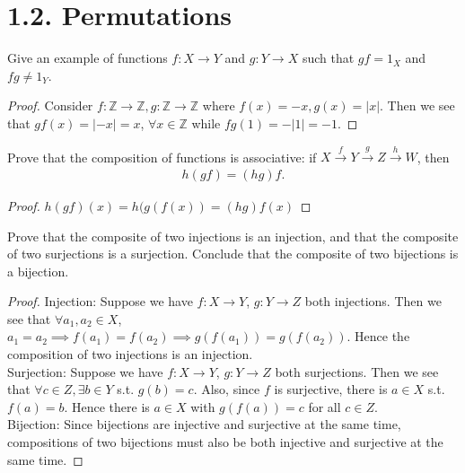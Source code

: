 \documentclass[15pt]{article}
\newenvironment{exercise}[2][Exercise]{\begin{trivlist}
\item[\hskip \labelsep {\bfseries #1}\hskip \labelsep {\bfseries #2.}]}
{\end{trivlist}}
\begin{document}
\section*{1.2.  Permutations}

 \begin{exercise}{1.5}

 Give an example of functions $f: X\rightarrow Y$ and $g: Y\rightarrow X$ such that $gf = 1_{X}$ and $fg \neq 1_Y$.
 \end{exercise} 

 \begin{proof}
    Consider $f:\mathbb{Z}\rightarrow\mathbb{Z}, g:\mathbb{Z}\rightarrow\mathbb{Z}$ where $f(x) = -x, g(x) = |x|$. Then we see that ${gf(x)=|-x|=x}$,  $\forall x\in \mathbb{Z}$ while ${fg(1)=-|1|=-1}$.
 \end{proof}



 \begin{exercise}{1.6}

Prove that the composition of functions is associative: if $X\xrightarrow{f}Y\xrightarrow{g}Z\xrightarrow{h}W$, then \begin{align*}h(gf)=(hg)f.\end{align*}
 \end{exercise}
\begin{proof}
     $h(gf) (x) = h(g(f(x)) = (hg)f(x)$ 
\end{proof}





\begin{exercise}{1.7}

Prove that the composite of two injections is an injection, and that the composite of two surjections is a surjection. Conclude that the composite of two bijections is a bijection.
\end{exercise}

\begin{proof}
    Injection: Suppose we have $f:X\rightarrow Y$, $g:Y\rightarrow Z$ both injections. Then we see that $\forall a_1,a_2\in X$, $a_1=a_2 \implies f(a_1)=f(a_2) \implies g(f(a_1)) = g(f(a_2))$. Hence the composition of two injections is an injection.\\
    Surjection: Suppose we have $f:X\rightarrow Y$, $g:Y\rightarrow Z$ both surjections. Then we see that $\forall c \in Z, \exists b \in Y$ s.t. $g(b)=c$. Also, since $f$ is surjective, there is $a\in X$ s.t. $f(a)=b$. Hence there is $a\in X$ with $g(f(a)) = c$ for all $c\in Z$.\\
    Bijection: Since bijections are injective and surjective at the same time, compositions of two bijections must also be both injective and surjective at the same time.
\end{proof}
\end{document}
